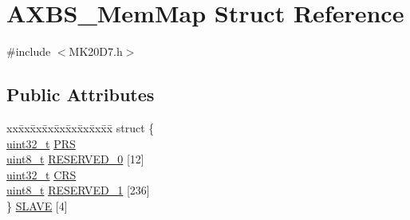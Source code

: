 \hypertarget{struct_a_x_b_s___mem_map}{}\section{A\+X\+B\+S\+\_\+\+Mem\+Map Struct Reference}
\label{struct_a_x_b_s___mem_map}


{\ttfamily \#include $<$M\+K20\+D7.\+h$>$}

\subsection*{Public Attributes}
\begin{DoxyCompactItemize}
\item 
\begin{tabbing}
xx\=xx\=xx\=xx\=xx\=xx\=xx\=xx\=xx\=\kill
struct \{\\
\>\hyperlink{_p_e___types_8h_a33594304e786b158f3fb30289278f5af}{uint32\_t} \hyperlink{struct_a_x_b_s___mem_map_a840c4c5791c39bad3cfa7140aaab0a1f}{PRS}\\
\>\hyperlink{_p_e___types_8h_aba7bc1797add20fe3efdf37ced1182c5}{uint8\_t} \hyperlink{struct_a_x_b_s___mem_map_abd29af23a1cdc627c9e3d58d5f0a572f}{RESERVED\_0} \mbox{[}12\mbox{]}\\
\>\hyperlink{_p_e___types_8h_a33594304e786b158f3fb30289278f5af}{uint32\_t} \hyperlink{struct_a_x_b_s___mem_map_af4605bf03bb478b8076fffe21d52671f}{CRS}\\
\>\hyperlink{_p_e___types_8h_aba7bc1797add20fe3efdf37ced1182c5}{uint8\_t} \hyperlink{struct_a_x_b_s___mem_map_afde851f375ecbf7be79930c0127ddcb1}{RESERVED\_1} \mbox{[}236\mbox{]}\\
\} \hyperlink{struct_a_x_b_s___mem_map_a09a930ae27c168079dfaa520d093b9ff}{SLAVE} \mbox{[}4\mbox{]}\\


\end{tabbing}
\end{DoxyCompactItemize}
